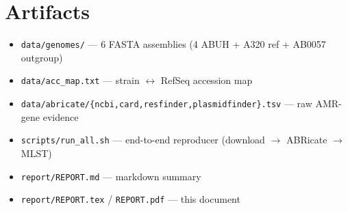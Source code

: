 \documentclass[11pt]{article}
\begin{document}
\section{Artifacts}

\begin{itemize}
  \item \texttt{data/genomes/} --- 6 FASTA assemblies (4 ABUH + A320 ref + AB0057 outgroup)
  \item \texttt{data/acc\_map.txt} --- strain $\leftrightarrow$ RefSeq accession map
  \item \texttt{data/abricate/\{ncbi,card,resfinder,plasmidfinder\}.tsv} --- raw AMR-gene evidence
  \item \texttt{scripts/run\_all.sh} --- end-to-end reproducer (download $\to$ ABRicate $\to$ MLST)
  \item \texttt{report/REPORT.md} --- markdown summary
  \item \texttt{report/REPORT.tex} / \texttt{REPORT.pdf} --- this document
\end{itemize}
\end{document}
